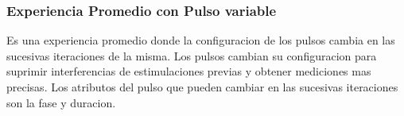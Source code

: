 \subsubsection{Experiencia Promedio con Pulso variable}
Es una experiencia promedio donde la configuracion de los pulsos cambia en las sucesivas iteraciones de la misma.
Los pulsos cambian su configuracion para suprimir interferencias de estimulaciones previas y obtener mediciones
mas precisas. Los atributos del pulso que pueden cambiar en las sucesivas iteraciones son la fase y duracion. 

\newpage